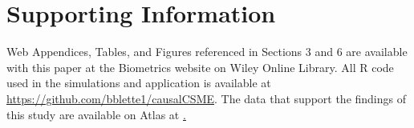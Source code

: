 \documentclass[useAMS,usenatbib,referee]{biom}
\begin{document}







\section*{Supporting Information}

Web Appendices, Tables, and Figures referenced in Sections 3 and 6 are available with this paper at the Biometrics website on Wiley Online Library. All R code used in the simulations and application is available at \href{https://github.com/bblette1/causalCSME}{https://github.com/bblette1/causalCSME}. The data that support the findings of this study are available on Atlas at \href{https://atlas.scharp.org/cpas/project/HVTN\%20Public\%20Data/HVTN\%20505/begin.view}.\vspace*{-8pt}

\label{lastpage}
\end{document}
